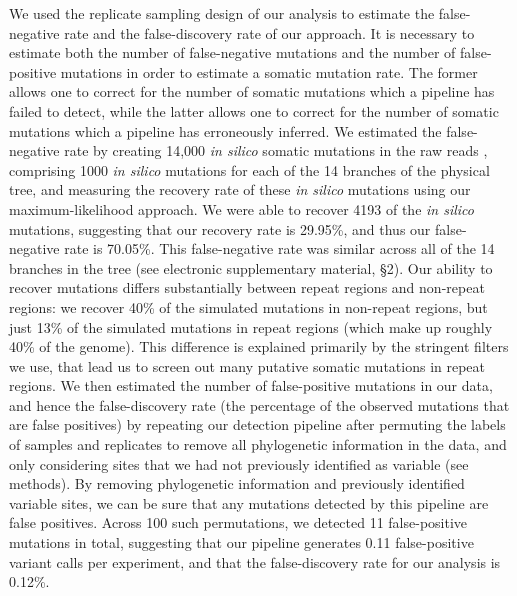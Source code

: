 We used the replicate sampling design of our analysis to estimate the false-negative rate and the false-discovery rate of our approach. It is necessary to estimate both the number of false-negative mutations and the number of false-positive mutations in order to estimate a somatic mutation rate. The former allows one to correct for the number of somatic mutations which a pipeline has failed to detect, while the latter allows one to correct for the number of somatic mutations which a pipeline has erroneously inferred. We estimated the false-negative rate by creating 14,000 \textit{in silico} somatic mutations in the raw reads \parencite{keightley_estimation_2014}, comprising 1000 \textit{in silico} mutations for each of the 14 branches of the physical tree, and measuring the recovery rate of these \textit{in silico} mutations using our maximum-likelihood approach. We were able to recover 4193 of the \textit{in silico} mutations, suggesting that our recovery rate is 29.95\%, and thus our false-negative rate is 70.05\%. This false-negative rate was similar across all of the 14 branches in the tree (see electronic supplementary material, §2). Our ability to recover mutations differs substantially between repeat regions and non-repeat regions: we recover 40\% of the simulated mutations in non-repeat regions, but just 13\% of the simulated mutations in repeat regions (which make up roughly 40\% of the genome). This difference is explained primarily by the stringent filters we use, that lead us to screen out many putative somatic mutations in repeat regions. We then estimated the number of false-positive mutations in our data, and hence the false-discovery rate (the percentage of the observed mutations that are false positives) by repeating our detection pipeline after permuting the labels of samples and replicates to remove all phylogenetic information in the data, and only considering sites that we had not previously identified as variable (see methods). By removing phylogenetic information and previously identified variable sites, we can be sure that any mutations detected by this pipeline are false positives. Across 100 such permutations, we detected 11 false-positive mutations in total, suggesting that our pipeline generates 0.11 false-positive variant calls per experiment, and that the false-discovery rate for our analysis is 0.12\%.

